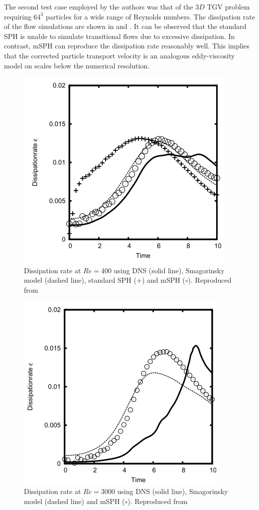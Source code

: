 The second test case employed by the authors was that of the $3D$ TGV problem requiring $64^3$ particles for a wide range of Reynolds numbers. The dissipation rate of the flow simulations are shown in  and . It can be observed that the standard SPH is unable to simulate transitional flows due to excessive dissipation. In contrast, mSPH can reproduce the dissipation rate reasonably well. This implies that the corrected particle transport velocity is an analogous eddy-viscosity model on scales below the numerical resolution.
\begin{figure}[htbp!]
    \centering
    \includegraphics[scale=0.7]{Figures/research_papers/adami2012-dissipation-re400.png}
    \caption{Dissipation rate at $Re = 400$ using DNS (solid line), Smagorinsky model (dashed line), standard SPH ($+$) and mSPH ($\circ$). Reproduced from \cite{Adami2012}}
    \label{fig:adami2012-dissipation-re400}
\end{figure}
\begin{figure}[htbp!]
    \centering
    \includegraphics[scale=0.7]{Figures/research_papers/adami2012-dissipation-re3000.png}
    \caption{Dissipation rate at $Re = 3000$ using DNS (solid line), Smagorinsky model (dashed line) and mSPH ($\circ$). Reproduced from \cite{Adami2012}}
    \label{fig:adami2012-dissipation-re3000}
\end{figure}

